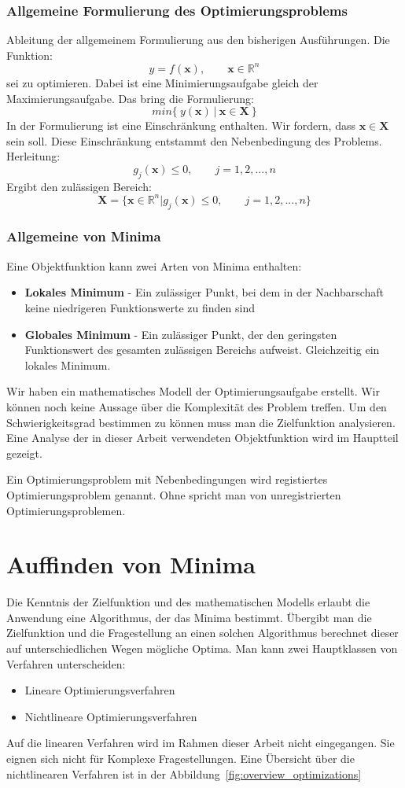 \subsubsection{Allgemeine Formulierung des Optimierungsproblems}
%
Ableitung der allgemeinem Formulierung aus den bisherigen Ausführungen. Die Funktion:
$$
y=f(\mathbf{x}), \qquad \mathbf{x}\in\mathbb{R}^n
$$
sei zu optimieren. Dabei ist eine Minimierungsaufgabe gleich der Maximierungsaufgabe. Das bring die Formulierung:
%
\begin{equation}
\label{eq:optimazion1}
min\{~y(\mathbf{x})~|~\mathbf{x}\in\mathbf{X}~\}
\end{equation}
%
In der Formulierung ist eine Einschränkung enthalten. Wir fordern, dass $\mathbf{x}\in\mathbf{X}$ sein soll. Diese Einschränkung entstammt den Nebenbedingung des Problems. Herleitung:
$$
g_j(\mathbf{x})\leq 0, \qquad j=1,2,...,n
$$
Ergibt den zulässigen Bereich:
$$
\mathbf{X}=\{\mathbf{x}\in \mathbb{R}^n | g_j(\mathbf{x})\leq 0, \qquad j=1,2,...,n\}
$$
%
\subsubsection{Allgemeine von Minima}
%
Eine Objektfunktion kann zwei Arten von Minima enthalten:
\begin{itemize}[itemsep=1mm]
\item \textbf{Lokales Minimum} - Ein zulässiger Punkt, bei dem in der Nachbarschaft keine niedrigeren Funktionswerte zu finden sind
\item \textbf{Globales Minimum} - Ein zulässiger Punkt, der den geringsten Funktionswert des gesamten zulässigen Bereichs aufweist. Gleichzeitig ein lokales Minimum.
\end{itemize}
%
Wir haben ein mathematisches Modell der Optimierungsaufgabe erstellt. Wir können noch keine Aussage über die Komplexität des Problem treffen. Um den Schwierigkeitsgrad bestimmen zu können muss man die Zielfunktion analysieren. Eine Analyse der in dieser Arbeit verwendeten Objektfunktion wird im Hauptteil gezeigt.

Ein Optimierungsproblem mit Nebenbedingungen wird registiertes Optimierungsproblem genannt. Ohne spricht man von unregistrierten Optimierungsproblemen.
%
\section{Auffinden von Minima}
%
Die Kenntnis der Zielfunktion und des mathematischen Modells erlaubt die Anwendung eine Algorithmus, der das Minima bestimmt. Übergibt man die Zielfunktion und die Fragestellung an einen solchen Algorithmus berechnet dieser auf unterschiedlichen Wegen mögliche Optima. Man kann zwei Hauptklassen von Verfahren unterscheiden:
%
\begin{itemize}
\item Lineare Optimierungsverfahren
\item Nichtlineare Optimierungsverfahren
\end{itemize}
%
Auf die linearen Verfahren wird im Rahmen dieser Arbeit nicht eingegangen. Sie eignen sich nicht für Komplexe Fragestellungen. Eine Übersicht über die nichtlinearen Verfahren ist in der Abbildung~\ref{fig:overview_optimizations}
%
